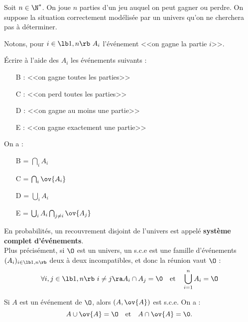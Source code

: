\documentclass[11pt]{article}
\begin{document}
\begin{ex}{}{}
    Soit $n\in\N^*$. On joue $n$ parties d'un jeu auquel on peut gagner ou perdre. On suppose la situation correctement modélisée par un univers qu'on ne cherchera pas à déterminer.
    \begin{center}
        Notons, pour $i\in\lb1,n\rb~A_i$ l'événement <<on gagne la partie $i$>>.
    \end{center}
    Écrire à l'aide des $A_i$ les événements suivants :
    \begin{itemize}[topsep=0pt,itemsep=-0.9 ex]
        \item[B] : <<on gagne toutes les parties>>
        \item[C] : <<on perd toutes les parties>>
        \item[D] : <<on gagne au moins une partie>>
        \item[E] : <<on gagne exactement une partie>>
    \end{itemize}
    \tcblower
    On a :
    \begin{itemize}[topsep=0pt,itemsep=-0.9 ex]
        \item[B] = $\bigcap_iA_i$
        \item[C] = $\bigcap_i\ov{A_i}$
        \item[D] = $\bigcup_iA_i$
        \item[E] = $\bigcup_iA_i\bigcap_{j\neq i}\ov{A_j}$
    \end{itemize}
\end{ex}

\begin{defi}{}{}
    En probabilités, un recouvrement disjoint de l'univers est appelé \textbf{système complet d'événements}.\\
    Plus précisément, si $\O$ est un univers, un s.c.e est une famille d'événements $(A_i)_{i\in\lb1,n\rb}$ deux à deux incompatibles, et donc la réunion vaut $\O$ :
    \begin{equation*}
        \forall i,j\in\lb1,n\rb~i\neq j\ra A_i\cap A_j = \0 \quad \text{et} \quad \bigcup_{i=1}^nA_i=\O
    \end{equation*}
\end{defi}

\begin{prop}{}{}
    Si $A$ est un événement de $\O$, alors $(A,\ov{A})$ est s.c.e.
    \tcblower
    On a :
    \begin{equation*}
        A\cup\ov{A}=\O \quad \text{et} \quad A\cap\ov{A}=\0.
    \end{equation*}
\end{prop}
\end{document}
